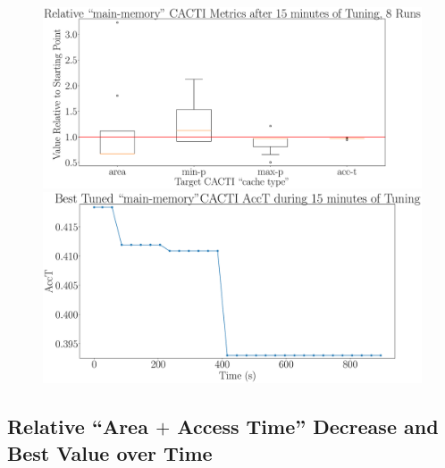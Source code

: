 \documentclass[12pt, a4paper]{article}
\begin{document}
\begin{figure}[htpb]
    \begin{minipage}{.48\textwidth}
        \centering
        \includegraphics[width=.8\textwidth]{target_acct_900_main-memory}
    \end{minipage}%
    \begin{minipage}{.48\textwidth}
        \centering
        \includegraphics[width=.8\textwidth]{target_acct_900_main-memory_best}
    \end{minipage}%
\end{figure}

\newpage

\subsection{Relative ``Area $+$ Access Time'' Decrease and Best Value over Time}
\end{document}
